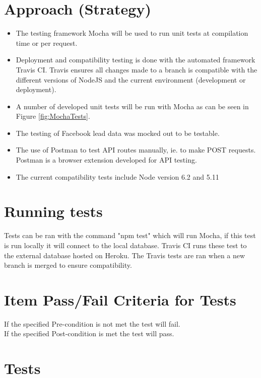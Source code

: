 \documentclass{article}
\begin{document}
\section{Approach (Strategy)}
\begin{itemize}
	\item The testing framework Mocha will be used to run unit tests at compilation time or per request.
	\item Deployment and compatibility testing is done with the automated framework Travis CI. Travis ensures all changes made to a branch is compatible with the different versions of NodeJS and the current environment (development or deployment).
	\item A number of developed unit tests will be run with Mocha as can be seen in Figure \ref{fig:MochaTests}.
	\item The testing of Facebook lead data was mocked out to be testable. 
	\item The use of Postman to test API routes manually, ie. to make POST requests. Postman is a browser extension developed for API testing.
	\item The current compatibility tests include Node version 6.2 and 5.11 
\end{itemize}


\section{Running tests}
Tests can be ran with the command "npm test" which will run Mocha, if this test is run locally it will connect to the local database.
Travis CI runs these test to the external database hosted on Heroku. The Travis tests are ran when a new branch is merged to ensure compatibility.
\section{Item Pass/Fail Criteria for Tests}
If the specified Pre-condition is not met the test will fail. \\
If the specified Post-condition is met the test will pass.
\cleardoublepage
\section{Tests}
\end{document}

